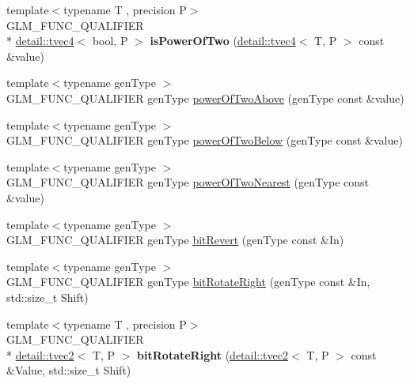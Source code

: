 \begin{DoxyCompactItemize}
\item 
\hypertarget{namespaceglm_a071c03cdef9f44cac492f572b218c42c}{{\footnotesize template$<$typename T , precision P$>$ }\\G\-L\-M\-\_\-\-F\-U\-N\-C\-\_\-\-Q\-U\-A\-L\-I\-F\-I\-E\-R \\*
\hyperlink{structglm_1_1detail_1_1tvec4}{detail\-::tvec4}$<$ bool, P $>$ {\bfseries is\-Power\-Of\-Two} (\hyperlink{structglm_1_1detail_1_1tvec4}{detail\-::tvec4}$<$ T, P $>$ const \&value)}\label{namespaceglm_a071c03cdef9f44cac492f572b218c42c}

\item 
{\footnotesize template$<$typename gen\-Type $>$ }\\G\-L\-M\-\_\-\-F\-U\-N\-C\-\_\-\-Q\-U\-A\-L\-I\-F\-I\-E\-R gen\-Type \hyperlink{group__gtx__bit_gaa49786cf3f8a1f65de6e70b6088a811e}{power\-Of\-Two\-Above} (gen\-Type const \&value)
\item 
{\footnotesize template$<$typename gen\-Type $>$ }\\G\-L\-M\-\_\-\-F\-U\-N\-C\-\_\-\-Q\-U\-A\-L\-I\-F\-I\-E\-R gen\-Type \hyperlink{group__gtx__bit_gaeceaea338213cbff7a275460e35e8d0c}{power\-Of\-Two\-Below} (gen\-Type const \&value)
\item 
{\footnotesize template$<$typename gen\-Type $>$ }\\G\-L\-M\-\_\-\-F\-U\-N\-C\-\_\-\-Q\-U\-A\-L\-I\-F\-I\-E\-R gen\-Type \hyperlink{group__gtx__bit_ga9e68299f4ca0cd6674efbee62d425b95}{power\-Of\-Two\-Nearest} (gen\-Type const \&value)
\item 
{\footnotesize template$<$typename gen\-Type $>$ }\\G\-L\-M\-\_\-\-F\-U\-N\-C\-\_\-\-Q\-U\-A\-L\-I\-F\-I\-E\-R gen\-Type \hyperlink{group__gtx__bit_ga2d3939fbf96aa54cb2fd3461a60aba02}{bit\-Revert} (gen\-Type const \&In)
\item 
{\footnotesize template$<$typename gen\-Type $>$ }\\G\-L\-M\-\_\-\-F\-U\-N\-C\-\_\-\-Q\-U\-A\-L\-I\-F\-I\-E\-R gen\-Type \hyperlink{group__gtx__bit_gaf999dbfe97a5be5ea68841a58cf89a4a}{bit\-Rotate\-Right} (gen\-Type const \&In, std\-::size\-\_\-t Shift)
\item 
\hypertarget{namespaceglm_ad95103bee42199639a722beef3c98538}{{\footnotesize template$<$typename T , precision P$>$ }\\G\-L\-M\-\_\-\-F\-U\-N\-C\-\_\-\-Q\-U\-A\-L\-I\-F\-I\-E\-R \\*
\hyperlink{structglm_1_1detail_1_1tvec2}{detail\-::tvec2}$<$ T, P $>$ {\bfseries bit\-Rotate\-Right} (\hyperlink{structglm_1_1detail_1_1tvec2}{detail\-::tvec2}$<$ T, P $>$ const \&Value, std\-::size\-\_\-t Shift)}\label{namespaceglm_ad95103bee42199639a722beef3c98538}


\end{DoxyCompactItemize}
